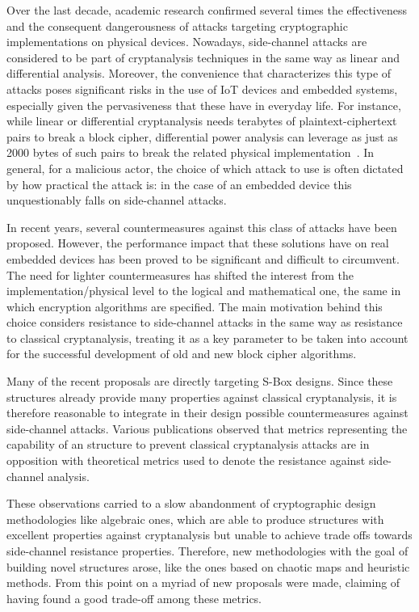 Over the last decade, academic research confirmed several times the effectiveness and the consequent dangerousness of attacks targeting cryptographic implementations on physical devices. Nowadays, side-channel attacks are considered to be part of cryptanalysis techniques in the same way as linear and differential analysis. Moreover, the convenience that characterizes this type of attacks poses significant risks in the use of IoT devices and embedded systems, especially given the pervasiveness that these have in everyday life. For instance, while linear or differential cryptanalysis needs terabytes of plaintext-ciphertext pairs to break a block cipher, differential power analysis can leverage as just as 2000 bytes of such pairs to break the related physical implementation~\cite{carlet2005highly}. In general, for a malicious actor, the choice of which attack to use is often dictated by how practical the attack is: in the case of an embedded device this unquestionably falls on side-channel attacks.

In recent years, several countermeasures against this class of attacks have been proposed. However, the performance impact that these solutions have on real embedded devices has been proved to be significant and difficult to circumvent. The need for lighter countermeasures has shifted the interest from the implementation/physical level to the logical and mathematical one, the same in which encryption algorithms are specified. The main motivation behind this choice considers resistance to side-channel attacks in the same way as resistance to classical cryptanalysis, treating it as a key parameter to be taken into account for the successful development of old and new block cipher algorithms.

Many of the recent proposals are directly targeting S-Box designs. Since these structures
already provide many properties against classical cryptanalysis, it is therefore reasonable
to integrate in their design possible countermeasures against side-channel attacks. Various publications observed that metrics representing the capability of an \sbocs{} structure to prevent classical cryptanalysis attacks are in opposition with theoretical metrics used to denote the resistance against side-channel analysis.

These observations carried to a slow abandonment of cryptographic design methodologies like algebraic ones, which are able to produce \sbocs{} structures with excellent properties against cryptanalysis but unable to achieve trade offs towards side-channel resistance properties. Therefore, new methodologies with the goal of building novel \sbocs{} structures arose, like the ones based on chaotic maps and heuristic methods. From this point on a myriad of new \sbocs{} proposals were made, claiming of having found a good trade-off among these metrics.

